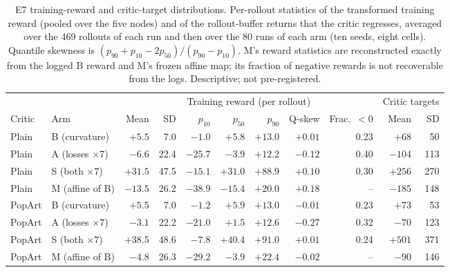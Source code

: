 \begin{table}[H]
\caption{E7 training-reward and critic-target distributions. Per-rollout statistics of the transformed training reward (pooled over the five nodes) and of the rollout-buffer returns that the critic regresses, averaged over the 469 rollouts of each run and then over the 80 runs of each arm (ten seeds, eight cells). Quantile skewness is $(p_{90}+p_{10}-2p_{50})/(p_{90}-p_{10})$. M's reward statistics are reconstructed exactly from the logged B reward and M's frozen affine map; its fraction of negative rewards is not recoverable from the logs. Descriptive; not pre-registered.}
\label{tab:dist}
\centering\scriptsize\setlength{\tabcolsep}{4pt}
\begin{tabular}{@{}llrrrrrrrrr@{}}
\toprule
& & \multicolumn{7}{c}{Training reward (per rollout)} & \multicolumn{2}{c}{Critic targets} \\
\cmidrule(lr){3-9}\cmidrule(l){10-11}
Critic & Arm & Mean & SD & $p_{10}$ & $p_{50}$ & $p_{90}$ & Q-skew & Frac.\ $<0$ & Mean & SD \\
\midrule
Plain & B (curvature) & $+5.5$ & 7.0 & $-1.0$ & $+5.8$ & $+13.0$ & $+0.01$ & 0.23 & $+68$ & 50 \\
Plain & A (losses $\times7$) & $-6.6$ & 22.4 & $-25.7$ & $-3.9$ & $+12.2$ & $-0.12$ & 0.40 & $-104$ & 113 \\
Plain & S (both $\times7$) & $+31.5$ & 47.5 & $-15.1$ & $+31.0$ & $+88.9$ & $+0.10$ & 0.30 & $+256$ & 270 \\
Plain & M (affine of B) & $-13.5$ & 26.2 & $-38.9$ & $-15.4$ & $+20.0$ & $+0.18$ & -- & $-185$ & 148 \\
PopArt & B (curvature) & $+5.5$ & 7.0 & $-1.2$ & $+5.9$ & $+13.0$ & $-0.01$ & 0.23 & $+73$ & 53 \\
PopArt & A (losses $\times7$) & $-3.1$ & 22.2 & $-21.0$ & $+1.5$ & $+12.6$ & $-0.27$ & 0.32 & $-70$ & 123 \\
PopArt & S (both $\times7$) & $+38.5$ & 48.6 & $-7.8$ & $+40.4$ & $+91.0$ & $+0.01$ & 0.24 & $+501$ & 371 \\
PopArt & M (affine of B) & $-4.8$ & 26.3 & $-29.2$ & $-3.9$ & $+22.4$ & $-0.02$ & -- & $-90$ & 146 \\
\bottomrule
\end{tabular}
\end{table}

